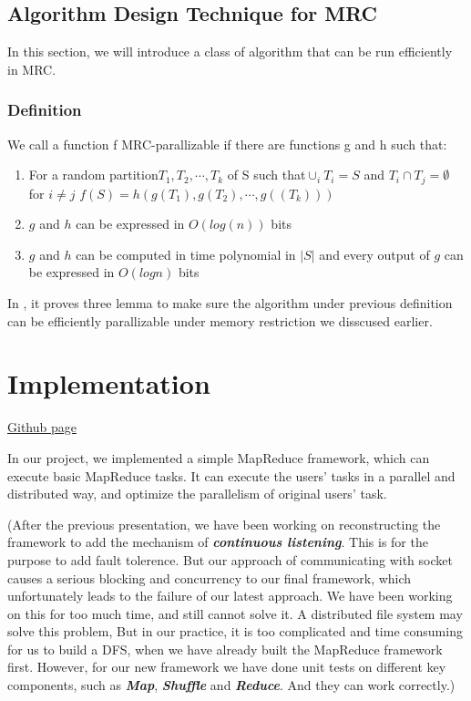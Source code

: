 \documentclass{article}
\begin{document}
\subsection{Algorithm Design Technique for MRC}
In this section, we will introduce a class of algorithm that can be run efficiently in MRC.
\subsubsection{Definition \cite{model}}
We call a function f MRC-parallizable if there are functions g and h such that:
\begin{enumerate}
      \item For a random partition${T_1,T_2,\cdots,T_k}$ of S such that$\cup_iT_i = S$ and $T_i \cap T_j = \emptyset $
      for $i \neq j$ $f(S) = h(g(T_1),g(T_2),\cdots,g((T_k)))$
      \item $g$ and $h$ can be expressed in $O(log(n))$ bits
      \item $g$ and $h$  can be computed in time polynomial in $|S|$
      and every output of $g$ can be expressed in $O(log n)$
      bits
\end{enumerate}
In \cite{model}, it proves three lemma to make sure the algorithm under previous definition can be efficiently parallizable under memory restriction we disscused earlier.


\section{Implementation }

\href{https://github.com/beiduqiu/549_MapReduce.git}{Github page}


In our project, we implemented a simple MapReduce framework, which can execute basic MapReduce tasks. It can execute the users' tasks in a parallel and distributed way, and optimize the parallelism of original users' task.

(After the previous presentation, we have been working on reconstructing the framework to add the mechanism of \textbf{\textit{continuous listening}}. This is for the purpose to add fault tolerence. But our approach of communicating with socket causes a serious blocking and concurrency to our final framework, which unfortunately leads to the failure of our latest approach. We have been working on this for too much time, and still cannot solve it. A distributed file system may solve this problem, But in our practice, it is too complicated and time consuming for us to build a DFS, when we have already built the MapReduce framework first. However, for our new framework we have done unit tests on different key components, such as \textbf{\textit{Map}}, \textbf{\textit{Shuffle}} and \textbf{\textit{Reduce}}. And they can work correctly.)
\end{document}

